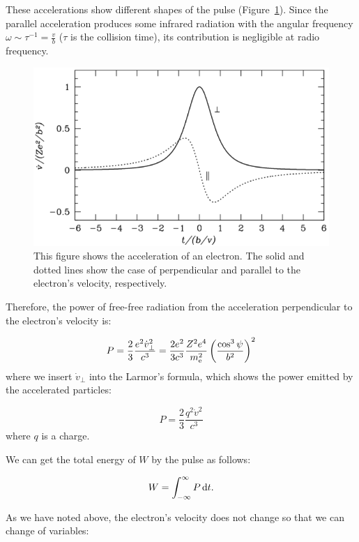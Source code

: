 These accelerations show different shapes of the pulse (Figure~\ref{fig:nrao_radio4n3}).
Since the parallel acceleration produces some infrared radiation with the angular frequency $\omega \sim \tau^{-1} = \frac{v}{b}$ ($\tau$ is the collision time), its contribution is negligible at radio frequency.

\begin{figure}[htbp]
\centering
	\includegraphics[width=.7\linewidth]{Chapter_2/Figures/NRAO_radio4n3.png}
    \caption[The acceleration of an electron by an ion]{\label{fig:nrao_radio4n3}
        This figure shows the acceleration of an electron.
        The solid and dotted lines show the case of perpendicular and parallel to the electron's velocity, respectively.
    }
\end{figure}

Therefore, the power of free-free radiation from the acceleration perpendicular to the electron's velocity is:

\begin{equation}\label{eq:essential_radio4n17}
    P=\frac{2}{3} \frac{e^{2} \dot{v}_{\perp}^{2}}{c^{3}}=\frac{2 e^{2}}{3 c^{3}} \frac{Z^{2} e^{4}}{m_{\mathrm{e}}^{2}}\left(\frac{\cos ^{3} \psi}{b^{2}}\right)^{2}
\end{equation}
where we insert $\dot{v}_{\perp}$ into the Larmor's formula, which shows the power emitted by the accelerated particles:

\begin{equation}
    P = \frac{2}{3}\frac{q^2\dot{v}^2}{c^3}
\end{equation}
where $q$ is a charge.

We can get the total energy of $W$ by the pulse as follows:

\begin{equation}\label{eq:essential_radio4n18}
    W = \int^{\infty}_{-\infty} P\,\mathrm{d}t.
\end{equation}

As we have noted above, the electron's velocity does not change so that we can change of variables:


